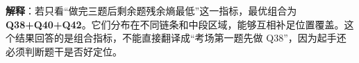 \textbf{解释}：若只看“做完三题后剩余题残余熵最低”这一指标，最优组合为\textbf{Q38+Q40+Q42}。它们分布在不同链条和中段区域，能够互相补足位置覆盖。这个结果回答的是组合指标，不能直接翻译成“考场第一题先做 Q38”，因为起手还必须判断题干是否好定位。